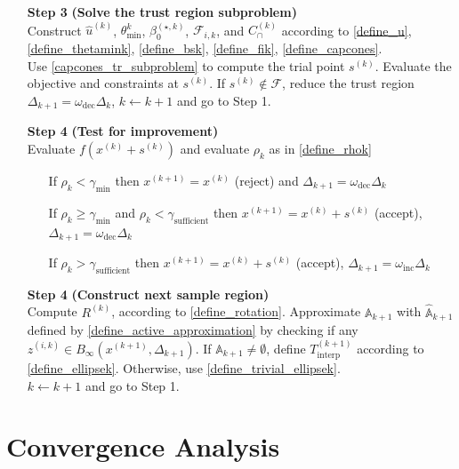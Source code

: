 \documentclass{article}
\theoremstyle{case}
\numberwithin{theorem}{subsection}
\newcommand{\activeconstraintskpo}{{\mathbb A_{k+1}}}
\newcommand{\approxactiveconstraintskpo}{{\mathbb {\hat A}_{k+1}}}
\newcommand{\bsk}{{\beta_0^{(\star, k)}}}
\newcommand{\capcones}{{C^{(k)}_{\cap}}}
\newcommand{\dk}{\Delta_k}
\newcommand{\dkpo}{\Delta_{k+1}}
\newcommand{\feasible}{{\mathcal F}}
\newcommand{\fik}{{\mathcal F_{i, k}}}
\newcommand{\gammabi}{\gamma_{\textrm{sufficient}}}
\newcommand{\gammasm}{\gamma_{\textrm{min}}}
\newcommand{\huk}{{{\hat u}^{(k)}}}
\newcommand{\mfk}{{{m}_f}^{(k)}}
\newcommand{\omegadec}{\omega_{\text{dec}}}
\newcommand{\omegainc}{\omega_{\text{inc}}}
\newcommand{\rk}{\rho_k}
\newcommand{\rotk}{{R^{(k)}}}
\newcommand{\sampletrkpo}{{T_{\text{interp}}^{(k+1)}}}
\newcommand{\sk}{{{s}^{(k)}}}
\newcommand{\thetamink}{{\theta^k_{\textrm{min}}}}
\newcommand{\xkpo}{{{x}^{(k+1)}}}
\newcommand{\xk}{{x^{(k)}}}
\newcommand{\zik}{{z^{(i, k)}}}
\begin{document}
\begin{algorithm}[H]
\begin{itemize}
        \item[\textbf{Step 3}] \textbf{(Solve the trust region subproblem)} \\
        	Construct $\huk$, $\thetamink$, $\bsk$, $\fik$, and $\capcones$ according to
        	\cref{define_u}, \cref{define_thetamink}, \cref{define_bsk}, \cref{define_fik}, \cref{define_capcones}. \\
        	Use \cref{capcones_tr_subproblem} to compute the trial point $\sk$.
        	Evaluate the objective and constraints at $\sk$.
        	If $\sk \not \in \feasible$, reduce the trust region $\Delta_{k+1} = \omegadec\dk$, $k \gets k+1$ and go to Step 1.
            
        \item[\textbf{Step 4}] \textbf{(Test for improvement)} \\
            Evaluate $f(\xk + \sk)$ and evaluate $\rk$ as in \cref{define_rhok} \begin{itemize}
                \item[] If $\rk < \gammasm$ then $\xkpo=\xk$ (reject) and $\Delta_{k+1} = \omegadec\dk$
                \item[] If $\rk \ge \gammasm$ and $\rk < \gammabi$ then $\xkpo=\xk+\sk$ (accept), $\Delta_{k+1} = \omegadec\dk$
                \item[] If $\rk > \gammabi$ then $\xkpo=\xk+\sk$ (accept), $\Delta_{k+1} = \omegainc\dk$
            \end{itemize}
            
        \item[\textbf{Step 4}] \textbf{(Construct next sample region)} \\
        	Compute $\rotk$, according to \cref{define_rotation}.
        	Approximate $\activeconstraintskpo$ with $\approxactiveconstraintskpo$ defined by \cref{define_active_approximation} by checking if any $\zik \in B_{\infty}\left(\xkpo, \dkpo\right)$.
        	If $\activeconstraintskpo \ne \emptyset$, define $\sampletrkpo$ according to \cref{define_ellipsek}.
        	Otherwise, use \cref{define_trivial_ellipsek}. \\
            $k \gets k+1$ and go to Step 1.
    \end{itemize}
\end{algorithm}

\section{Convergence Analysis}
\end{document}
